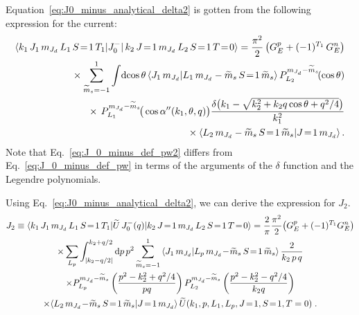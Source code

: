   Equation~\eqref{eq:J0_minus_analytical_delta2} is gotten from the
  following expression for the current:
  \begin{align}
   \mbraket{k_1 \, J_1 \, \mJd \, L_1 \, S\!=\!1 \, T_1}{J_0^{-}}
 	 {\,k_2 \, J\!=\!1 \, \mJd \, L_2 \, S\!=\!1 \, T\!=\!0}
 	 = \frac{\pi^2}{2} \, \big(G_E ^p + (-1)^{T_1} \, G_E^n\big) \\
 	 \null \times \sum_{\widetilde{m}_s = -1}^1 \int\!\dcostheta
 	 \, \braket{J_1 \, \mJd}{L_1 \, \mJd - \wt{m}_s \, S\!=\!1 \,\wt{m}_s}
 	 \,P_{L_2}^{\mJd - \widetilde{m}_s}\!(\cos\theta) \\
 	 \null \times
 	 \,P_{L_1}^{\mJd - \widetilde{m}_s}\!\big(\cos\thetacdoubleprime(k_1,
   \theta, q)
 	 \big) \frac{\delta\big(k_1-\sqrt{k_2^2 + k_2 q \cos\theta + q^2/4}\big)}
 	 {k_1^2} \\
 	 \null \times
 	 \CG{L_2}{\mJd - \widetilde{m}_s}{S\!=\!1}{\widetilde{m}_s}{J\!=\!1}{\mJd} \,.
 	\label{eq:J_0_minus_def_pw2}
  \end{align}
  Note that Eq.~\eqref{eq:J_0_minus_def_pw2} differs from
  Eq.~\eqref{eq:J_0_minus_def_pw} in terms of the arguments of the
  $\delta$ function and the Legendre polynomials.

  Using Eq.~\eqref{eq:J0_minus_analytical_delta2}, we can derive the expression
  for $J_2$.
  \begin{multline}
    J_2 \equiv \mbraket{{\thickmuskip=0mu k_1 \, J_1 \, \mJd \,
    L_1 \, S\!=\!1 \, T_1}}
    {\wt{U} \, J_0^-(q)}{{\thickmuskip=0mu k_2 \, J\!=\!1 \,
    \mJd \, L_2 \, S\!=\!1 \,
    T\!=\!0}} = \frac{2}{\pi} \frac{\pi^2}{2} \big(G_E^p + (-1)^{T_1} G_E^n
    \big) \\
    \times
    \sum_{L_p} \int_{|k_2 - q/2|}^{k_2 + q/2} \dd p \, p^2 \sum_{\mst = -1}^1
    \braket{J_1 \, \mJd}{L_p \, \mJd \!- \!\mst \, {S\!=\!1}
    \, \mst} \, \frac{2}{k_2 \, p \, q} \\
    \times
    P_{L_p}^{\mJd - \mst}\left(\frac{p^2 - k_2^2 + q^2/4}{p q}
    \right)
    P_{L_2}^{\mJd - \mst}\left(
    \frac{p^2 -k_2^2 - q^2/4}{k_2 q}
    \right) \\
    \times
    \CG{L_2}{\mJd\!-\!\mst}{S\!=\!1}{\mst}{J\!=\!1}{\mJd} \,
    \wt{U}({\thickmuskip=0mu k_1, p, L_1, L_p, J\!=\!1, S\!=\!1,
    T = 0}) \;.
  \end{multline}

